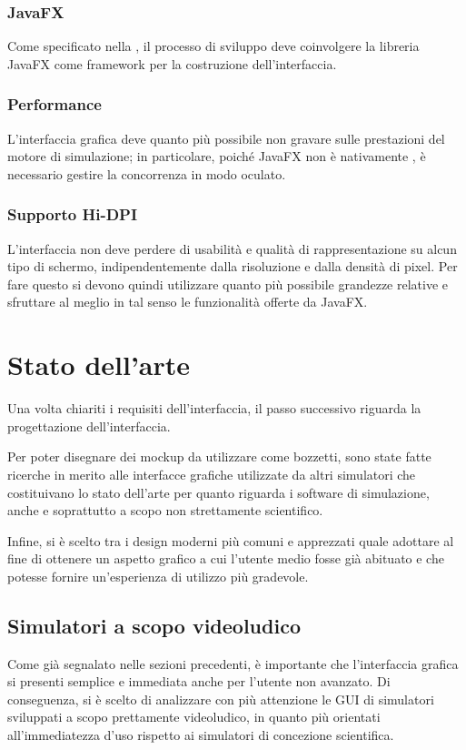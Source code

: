             \subsubsection{JavaFX}\label{subsubsec:jfx}
                Come specificato nella , il processo di sviluppo deve coinvolgere la libreria JavaFX come framework per la costruzione dell'interfaccia.

            \subsubsection{Performance}\label{subsubsec:performance}
                L'interfaccia grafica deve quanto più possibile non gravare sulle prestazioni del motore di simulazione;
                in particolare, poiché JavaFX non è nativamente , è necessario gestire la concorrenza in modo oculato.

            \subsubsection{Supporto Hi-DPI}\label{subsubsec:hidpi}
                L'interfaccia non deve perdere di usabilità e qualità di rappresentazione su alcun tipo di schermo, indipendentemente dalla risoluzione e dalla densità di pixel.
                Per fare questo si devono quindi utilizzare quanto più possibile grandezze relative e sfruttare al meglio in tal senso le funzionalità offerte da JavaFX.

    \section{Stato dell'arte}\label{sec:ispirazione}
        Una volta chiariti i requisiti dell'interfaccia, il passo successivo riguarda la progettazione dell'interfaccia.

        Per poter disegnare dei mockup da utilizzare come bozzetti, sono state fatte ricerche in merito alle interfacce grafiche utilizzate da altri simulatori che costituivano lo stato dell'arte per quanto riguarda i software di simulazione, anche e soprattutto a scopo non strettamente scientifico.

        Infine, si è scelto tra i design moderni più comuni e apprezzati quale adottare al fine di ottenere un aspetto grafico a cui l'utente medio fosse già abituato e che potesse fornire un'esperienza di utilizzo più gradevole.

        \subsection{Simulatori a scopo videoludico}\label{subsec:videogame}
            Come già segnalato nelle sezioni precedenti, è importante che l'interfaccia grafica si presenti semplice e immediata anche per l'utente non avanzato.
            Di conseguenza, si è scelto di analizzare con più attenzione le GUI di simulatori sviluppati a scopo prettamente videoludico, in quanto più orientati all'immediatezza d'uso rispetto ai simulatori di concezione scientifica.

